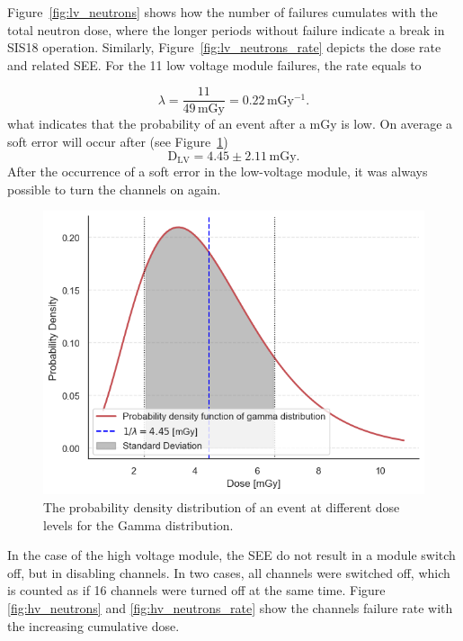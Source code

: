 Figure~\ref{fig:lv_neutrons} shows how the number of failures cumulates with the total neutron dose, where the longer periods without failure indicate a break in SIS18 operation. Similarly, Figure~\ref{fig:lv_neutrons_rate} depicts the dose rate and related \gls{SEE}.
For the 11 low voltage module failures, the rate equals to

   \begin{equation}
  \lambda = \frac{11}{49\,\mathrm{mGy}} = 0.22\mathrm{\,mGy^{-1}}.
\end{equation}
what indicates that the probability of an event after a mGy is low. On average a soft error will occur after (see Figure~\ref{fig:sis18_lv2})
\begin{equation}
    \mathrm{D}_{\mathrm{LV}}=4.45\pm 2.11\mathrm{\,mGy}.
\end{equation}
After the occurrence of a soft error in the low-voltage module, it was always possible to turn the channels on again.

\begin{figure}[!hbtp]
    \centering
    \includegraphics[width=0.65\columnwidth]{Chapter4/images/SIS18_LV_prob.png}
        \caption{The probability density distribution of an event at different dose levels for the Gamma distribution.}
    \label{fig:sis18_lv2}
\end{figure}


In the case of the high voltage module, the \gls{SEE} do not result in a module switch off, but in disabling channels. In two cases, all channels were switched off, which is counted as if 16 channels were turned off at the same time. Figure \ref{fig:hv_neutrons} and \ref{fig:hv_neutrons_rate} show the channels failure rate with the increasing cumulative dose. 


